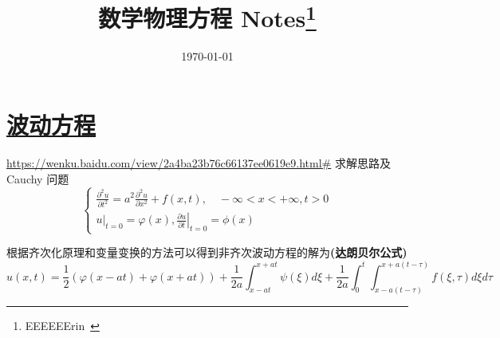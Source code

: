 \documentclass[10pt]{yerbaformat}
\title{数学物理方程 Notes\footnote{EEEEEErin~}}
\date{\today}
\begin{document}
\author{}
\maketitle
\tableofcontents
\footnotesize

\section{\href{https://wenku.baidu.com/view/cf58eb62ed630b1c58eeb506.html}{波动方程}}
\url{https://wenku.baidu.com/view/2a4ba23b76c66137ee0619e9.html#} 求解思路及 Cauchy 问题
$$
\left\{\begin{array}{l}
\frac{\partial^{2} u}{\partial t^{2}}=a^{2} \frac{\partial^{2} u}{\partial x^{2}} + f(x, t), \quad-\infty<x<+\infty, t>0 \\
\left.u\right|_{t=0}=\varphi(x),\left.\frac{\partial u}{\partial t}\right|_{t=0}=\phi(x)
\end{array}\right.
$$
\par 根据齐次化原理和变量变换的方法可以得到非齐次波动方程的解为\textbf{(达朗贝尔公式)}
$$
u(x, t)=\frac{1}{2}(\varphi(x-a t)+\varphi(x+a t))+\frac{1}{2 a} \int_{x-a t}^{x+a t} \psi(\xi) d \xi +\frac{1}{2 a} \int_{0}^{t} \int_{x-a(t-\tau)}^{x+a(t-\tau)} f(\xi, \tau) d \xi d \tau
$$

















  
\end{document}
